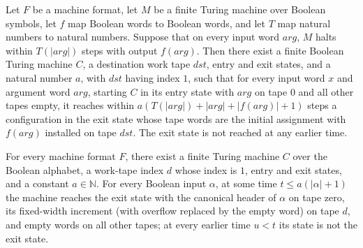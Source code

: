 \begin{lemma}
\label{Turing.MachineFormat.canonPreserveInstall}
\leanok
{}
Let $F$ be a machine format, let $M$ be a finite Turing machine over Boolean symbols,
let $f$ map Boolean words to Boolean words, and let $T$ map natural numbers to natural
numbers. Suppose that on every input word $arg$, $M$ halts within $T(|arg|)$ steps with
output $f(arg)$. Then there exist a finite Boolean Turing machine $C$, a destination
work tape $dst$, entry and exit states, and a natural number $a$, with $dst$ having
index $1$, such that for every input word $x$ and argument word $arg$, starting $C$ in
its entry state with $arg$ on tape $0$ and all other tapes empty, it reaches within
$a(T(|arg|)+|arg|+|f(arg)|+1)$ steps a configuration in the exit state whose tape words
are the initial assignment with $f(arg)$ installed on tape $dst$. The exit state is not
reached at any earlier time.
\end{lemma}

\begin{lemma}
\label{Turing.MachineFormat.exists_canonHeaderCountSeam}
\leanok
{}
For every machine format $F$, there exist a finite Turing machine $C$ over the Boolean
alphabet, a work-tape index $d$ whose index is $1$, entry and exit states, and a
constant $a\in\mathbb N$. For every Boolean input $\alpha$, at some time $t\le
a(|\alpha|+1)$ the machine reaches the exit state with the canonical header of
$\alpha$ on tape zero, its fixed-width increment (with overflow replaced by the empty
word) on tape $d$, and empty words on all other tapes; at every earlier time $u<t$ its
state is not the exit state.
\end{lemma}

